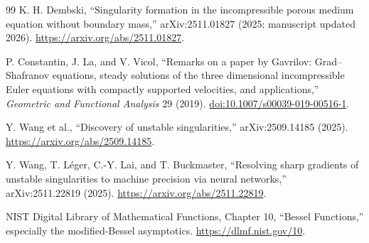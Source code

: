 \documentclass[11pt,a4paper,fontset=fandol]{ctexart}
\begin{document}
\begin{thebibliography}{99}
K. H. Dembski,
``Singularity formation in the incompressible porous medium equation without
boundary mass,'' arXiv:2511.01827 (2025; manuscript updated 2026).
\url{https://arxiv.org/abs/2511.01827}.

P. Constantin, J. La, and V. Vicol,
``Remarks on a paper by Gavrilov: Grad--Shafranov equations, steady solutions
of the three dimensional incompressible Euler equations with compactly
supported velocities, and applications,''
\emph{Geometric and Functional Analysis} 29 (2019).
\href{https://doi.org/10.1007/s00039-019-00516-1}{doi:10.1007/s00039-019-00516-1}.

Y. Wang et al.,
``Discovery of unstable singularities,'' arXiv:2509.14185 (2025).
\url{https://arxiv.org/abs/2509.14185}.

Y. Wang, T. L\'eger, C.-Y. Lai, and T. Buckmaster,
``Resolving sharp gradients of unstable singularities to machine precision
via neural networks,'' arXiv:2511.22819 (2025).
\url{https://arxiv.org/abs/2511.22819}.

NIST Digital Library of Mathematical Functions,
Chapter 10, ``Bessel Functions,'' especially the modified-Bessel asymptotics.
\url{https://dlmf.nist.gov/10}.

\end{thebibliography}
\end{document}

